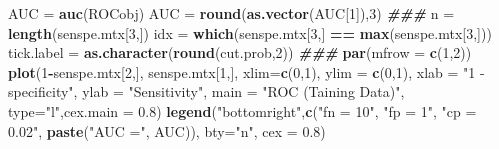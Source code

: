 \documentclass[
]{book}
\newenvironment{Shaded}{\begin{snugshade}}{\end{snugshade}}
\newcommand{\AttributeTok}[1]{\textcolor[rgb]{0.13,0.29,0.53}{#1}}
\newcommand{\DecValTok}[1]{\textcolor[rgb]{0.00,0.00,0.81}{#1}}
\newcommand{\DocumentationTok}[1]{\textcolor[rgb]{0.56,0.35,0.01}{\textbf{\textit{#1}}}}
\newcommand{\FloatTok}[1]{\textcolor[rgb]{0.00,0.00,0.81}{#1}}
\newcommand{\FunctionTok}[1]{\textcolor[rgb]{0.13,0.29,0.53}{\textbf{#1}}}
\newcommand{\NormalTok}[1]{#1}
\newcommand{\OtherTok}[1]{\textcolor[rgb]{0.56,0.35,0.01}{#1}}
\newcommand{\SpecialCharTok}[1]{\textcolor[rgb]{0.81,0.36,0.00}{\textbf{#1}}}
\newcommand{\StringTok}[1]{\textcolor[rgb]{0.31,0.60,0.02}{#1}}
\begin{document}
\begin{Shaded}
\begin{Highlighting}[]
\NormalTok{  AUC }\OtherTok{=} \FunctionTok{auc}\NormalTok{(ROCobj)}
\NormalTok{  AUC }\OtherTok{=} \FunctionTok{round}\NormalTok{(}\FunctionTok{as.vector}\NormalTok{(AUC[}\DecValTok{1}\NormalTok{]),}\DecValTok{3}\NormalTok{)}
  \DocumentationTok{\#\#\#}
\NormalTok{  n }\OtherTok{=} \FunctionTok{length}\NormalTok{(senspe.mtx[}\DecValTok{3}\NormalTok{,])}
\NormalTok{  idx }\OtherTok{=} \FunctionTok{which}\NormalTok{(senspe.mtx[}\DecValTok{3}\NormalTok{,] }\SpecialCharTok{==} \FunctionTok{max}\NormalTok{(senspe.mtx[}\DecValTok{3}\NormalTok{,]))}
\NormalTok{  tick.label }\OtherTok{=} \FunctionTok{as.character}\NormalTok{(}\FunctionTok{round}\NormalTok{(cut.prob,}\DecValTok{2}\NormalTok{))}
  \DocumentationTok{\#\#\#}
  \FunctionTok{par}\NormalTok{(}\AttributeTok{mfrow =} \FunctionTok{c}\NormalTok{(}\DecValTok{1}\NormalTok{,}\DecValTok{2}\NormalTok{))}
  \FunctionTok{plot}\NormalTok{(}\DecValTok{1}\SpecialCharTok{{-}}\NormalTok{senspe.mtx[}\DecValTok{2}\NormalTok{,], senspe.mtx[}\DecValTok{1}\NormalTok{,], }\AttributeTok{xlim=}\FunctionTok{c}\NormalTok{(}\DecValTok{0}\NormalTok{,}\DecValTok{1}\NormalTok{), }\AttributeTok{ylim =} \FunctionTok{c}\NormalTok{(}\DecValTok{0}\NormalTok{,}\DecValTok{1}\NormalTok{),}
       \AttributeTok{xlab =} \StringTok{"1 {-} specificity"}\NormalTok{, }
       \AttributeTok{ylab =} \StringTok{"Sensitivity"}\NormalTok{, }\AttributeTok{main =} \StringTok{"ROC (Taining Data)"}\NormalTok{, }\AttributeTok{type=}\StringTok{"l"}\NormalTok{,}\AttributeTok{cex.main =} \FloatTok{0.8}\NormalTok{)}
  \FunctionTok{legend}\NormalTok{(}\StringTok{"bottomright"}\NormalTok{,}\FunctionTok{c}\NormalTok{(}\StringTok{"fn = 10"}\NormalTok{, }\StringTok{"fp = 1"}\NormalTok{, }\StringTok{"cp = 0.02"}\NormalTok{, }\FunctionTok{paste}\NormalTok{(}\StringTok{"AUC ="}\NormalTok{, AUC)),}
         \AttributeTok{bty=}\StringTok{"n"}\NormalTok{, }\AttributeTok{cex =} \FloatTok{0.8}\NormalTok{)       }
  

\end{Highlighting}
\end{Shaded}
\end{document}
